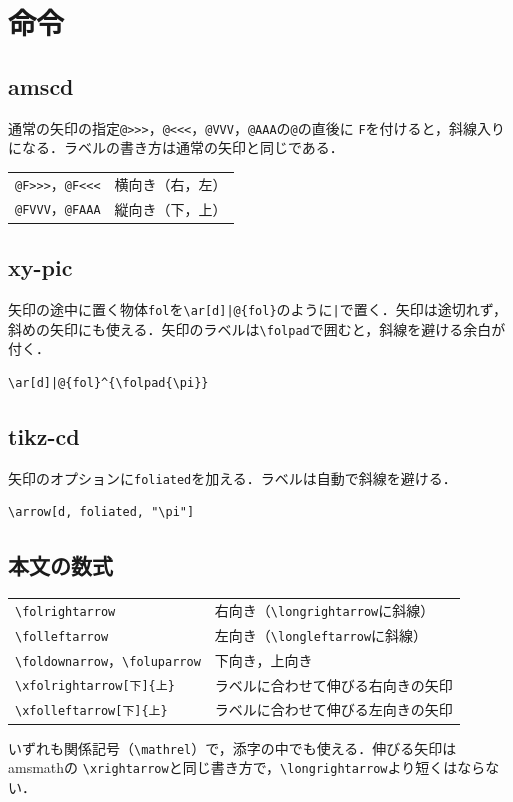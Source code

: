 \documentclass[dvipdfmx,paper=a4]{jlreq}
\newcommand\pkg[1]{\textsf{#1}}
\begin{document}
\section{命令}

\subsection{amscd}
通常の矢印の指定\verb|@>>>|，\verb|@<<<|，\verb|@VVV|，\verb|@AAA|の\verb|@|の直後に
\verb|F|を付けると，斜線入りになる．ラベルの書き方は通常の矢印と同じである．
\begin{center}
\begin{tabular}{ll}
\verb|@F>>>|，\verb|@F<<<| & 横向き（右，左）\\
\verb|@FVVV|，\verb|@FAAA| & 縦向き（下，上）
\end{tabular}
\end{center}

\subsection{xy-pic}
矢印の途中に置く物体\verb|fol|を\verb/\ar[d]|@{fol}/のように\verb/|/で置く．矢印は途切れず，
斜めの矢印にも使える．矢印のラベルは\verb|\folpad|で囲むと，斜線を避ける余白が付く．
\begin{Verbatim}
\ar[d]|@{fol}^{\folpad{\pi}}
\end{Verbatim}

\subsection{tikz-cd}
矢印のオプションに\verb|foliated|を加える．ラベルは自動で斜線を避ける．
\begin{Verbatim}
\arrow[d, foliated, "\pi"]
\end{Verbatim}

\subsection{本文の数式}
\begin{center}
\begin{tabular}{ll}
\verb|\folrightarrow| & 右向き（\verb|\longrightarrow|に斜線）\\
\verb|\folleftarrow| & 左向き（\verb|\longleftarrow|に斜線）\\
\verb|\foldownarrow|，\verb|\foluparrow| & 下向き，上向き\\
\verb|\xfolrightarrow[下]{上}| & ラベルに合わせて伸びる右向きの矢印\\
\verb|\xfolleftarrow[下]{上}| & ラベルに合わせて伸びる左向きの矢印
\end{tabular}
\end{center}
いずれも関係記号（\verb|\mathrel|）で，添字の中でも使える．伸びる矢印は\pkg{amsmath}の
\verb|\xrightarrow|と同じ書き方で，\verb|\longrightarrow|より短くはならない．
\end{document}
